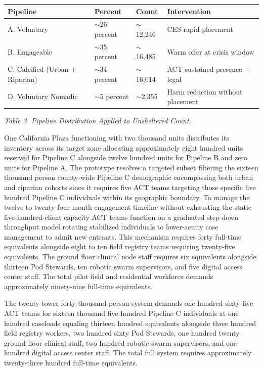 \documentclass[12pt, letterpaper]{article}
\begin{document}
{\singlespacing
\begin{tabularx}{\textwidth}{@{}lXll@{}}
\toprule
\rowcolor{rowgray}
Pipeline & Percent & Count & Intervention \\
\midrule
A. Voluntary & $\sim$26 percent & $\sim$12,246 & CES rapid placement \\
\rowcolor{rowgray}
B. Engageable & $\sim$35 percent & $\sim$16,485 & Warm offer at crisis window \\
C. Calcified (Urban + Riparian) & $\sim$34 percent & $\sim$16,014 & ACT sustained presence + legal \\
\rowcolor{rowgray}
D. Voluntary Nomadic & $\sim$5 percent & $\sim$2,355 & Harm reduction without placement \\
\bottomrule
\end{tabularx}\par
\vspace{8pt}
\noindent\textit{Table 3. Pipeline Distribution Applied to Unsheltered Count.}
\par}
One California Plaza functioning with two thousand units distributes its inventory across its target zone allocating approximately eight hundred units reserved for Pipeline C alongside twelve hundred units for Pipeline B and zero units for Pipeline A. The prototype resolves a targeted subset filtering the sixteen thousand person county-wide Pipeline C demographic encompassing both urban and riparian cohorts since it requires five ACT teams targeting those specific five hundred Pipeline C individuals within its geographic boundary. To manage the twelve to twenty-four month engagement timeline without exhausting the static five-hundred-client capacity ACT teams function on a graduated step-down throughput model rotating stabilized individuals to lower-acuity case management to admit new entrants. This mechanism requires forty full-time equivalents alongside eight to ten field registry teams requiring twenty-five equivalents. The ground floor clinical node staff requires six equivalents alongside thirteen Pod Stewards, ten robotic swarm supervisors, and five digital access center staff. The total pilot field and residential workforce demands approximately ninety-nine full-time equivalents.

The twenty-tower forty-thousand-person system demands one hundred sixty-five ACT teams for sixteen thousand five hundred Pipeline C individuals at one hundred caseloads equaling thirteen hundred equivalents alongside three hundred field registry workers, two hundred sixty Pod Stewards, one hundred twenty ground floor clinical staff, two hundred robotic swarm supervisors, and one hundred digital access center staff. The total full system requires approximately twenty-three hundred full-time equivalents.
\end{document}
